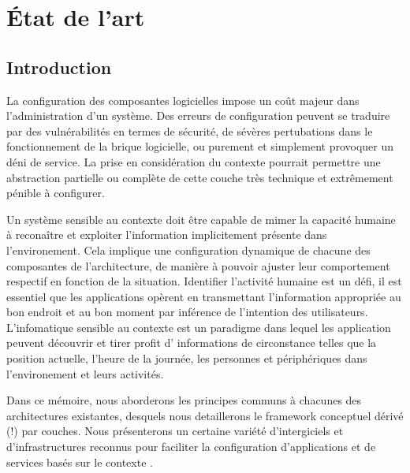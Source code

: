 \chapter{État de l'art}

\section{Introduction}

La configuration des composantes logicielles impose un coût majeur dans
l'administration d'un système. Des erreurs de configuration peuvent se traduire
par des vulnérabilités en termes de sécurité, de sévères pertubations dans le
fonctionnement de la brique logicielle, ou purement et simplement provoquer un
déni de service. La prise en considération du contexte pourrait permettre une
abstraction partielle ou complète de cette couche très technique et extrêmement
pénible à configurer.

Un système sensible au contexte doit être capable de mimer la capacité humaine à
reconaître et exploiter l'information implicitement présente dans
l'environement. Cela implique une configuration dynamique de chacune des
composantes de l'architecture, de manière à pouvoir ajuster leur comportement
respectif en fonction de la situation. Identifier l'activité humaine est un
défi, il est essentiel que les applications opèrent en transmettant
l'information appropriée au bon endroit et au bon moment par inférence de
l'intention des utilisateurs. L'infomatique sensible au contexte est un
paradigme dans lequel les application peuvent découvrir et tirer profit d'
informations de circonstance telles que la position actuelle, l'heure de la
journée, les personnes et périphériques dans l'environement et leurs activités.

Dans ce mémoire, nous aborderons les principes communs à chacunes des
architectures existantes, desquels nous detaillerons le framework conceptuel
dérivé (!) par couches. Nous présenterons un certaine variété d'intergiciels et
d'infrastructures reconnus pour faciliter la configuration d'applications et de
services basés sur le contexte \cite{uci-thesis-latex}.

% 


